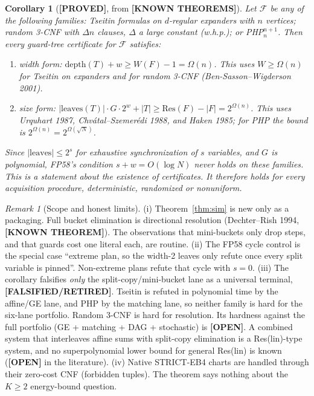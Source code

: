 \documentclass[11pt]{article}
\newtheorem{corollary}{Corollary}
\theoremstyle{definition}
\theoremstyle{remark}
\newtheorem{remark}{Remark}
\newcommand{\lab}[1]{\textbf{[#1]}}
\begin{document}
\begin{corollary}[\lab{PROVED}, from \lab{KNOWN THEOREMS}]\label{cor:lb}
Let $\mathcal F$ be any of the following families: Tseitin formulas on $d$-regular expanders
with $n$ vertices; random 3-CNF with $\Delta n$ clauses, $\Delta$ a large constant
(w.h.p.); or PHP$^{n+1}_n$. Then every guard-tree certificate for $\mathcal F$ satisfies:
\begin{enumerate}
\item width form: $\mathrm{depth}(T)+w\ge W(F)-1=\Omega(n)$. This uses $W\ge\Omega(n)$ for
Tseitin on expanders and for random 3-CNF (Ben-Sasson--Wigderson 2001).
\item size form: $|\mathrm{leaves}(T)|\cdot G\cdot2^{w}+|T|\ge\mathrm{Res}(F)-|F|=2^{\Omega(n)}$.
This uses Urquhart 1987, Chv\'atal--Szemer\'edi 1988, and Haken 1985; for PHP the bound is
$2^{\Omega(n)}=2^{\Omega(\sqrt N)}$.
\end{enumerate}
Since $|\mathrm{leaves}|\le2^{s}$ for exhaustive synchronization of $s$ variables, and $G$ is
polynomial, FP58's condition $s+w=O(\log N)$ \emph{never} holds on these families. This is a
statement about the existence of certificates. It therefore holds for every acquisition
procedure, deterministic, randomized or nonuniform.
\end{corollary}

\begin{remark}[Scope and honest limits]
(i) Theorem~\ref{thm:sim} is new only as a packaging. Full bucket elimination is directional
resolution (Dechter--Rish 1994, \lab{KNOWN THEOREM}). The observations that mini-buckets only
drop steps, and that guards cost one literal each, are routine.
(ii) The FP58 cycle control is the special case ``extreme plan, so the width-2 leaves only
refute once every split variable is pinned''. Non-extreme plans refute that cycle with $s=0$.
(iii) The corollary falsifies \emph{only} the split-copy/mini-bucket lane as a universal
terminal, \lab{FALSIFIED/RETIRED}. Tseitin is refuted in polynomial time by the affine/GE lane,
and PHP by the matching lane, so neither family is hard for the six-lane portfolio. Random
3-CNF is hard for resolution. Its hardness against the full portfolio (GE + matching + DAG +
stochastic) is \lab{OPEN}. A combined system that interleaves affine sums with split-copy
elimination is a Res(lin)-type system, and no superpolynomial lower bound for general
Res(lin) is known (\lab{OPEN} in the literature).
(iv) Native STRICT-EB4 charts are handled through their zero-cost CNF (forbidden tuples).
The theorem says nothing about the $K\ge2$ energy-bound question.
\end{remark}
\end{document}
